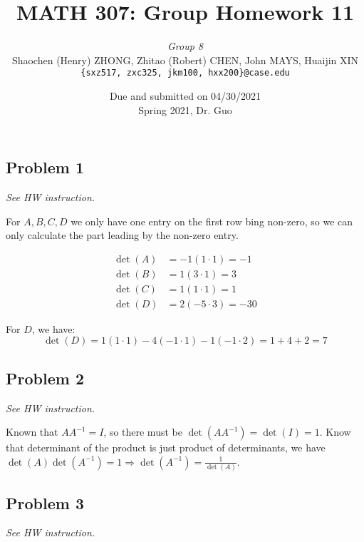 \documentclass[11pt]{article}
\newcommand{\ilc}{\texttt}
\begin{document}
\title{\textbf{MATH 307: Group Homework 11}}


\author{\textit{Group 8}\\
Shaochen (Henry) ZHONG, Zhitao (Robert) CHEN, John MAYS, Huaijin XIN\\ \ilc{\{sxz517, zxc325, jkm100, hxx200\}@case.edu}}

\date{Due and submitted on 04/30/2021 \\ Spring 2021, Dr. Guo}
\maketitle



\subsection*{Problem 1}
\textit{See HW instruction.}\newline

For $A, B, C, D$ we only have one entry on the first row bing non-zero, so we can only calculate the part leading by the non-zero entry.

\begin{align*}
    \det(A) &= - 1(1 \cdot 1) = -1 \\
    \det(B) &= 1(3 \cdot 1) = 3 \\
    \det(C) &= 1(1 \cdot 1) = 1 \\
    \det(D) &= 2(-5 \cdot 3) = -30
\end{align*}

For $D$, we have:
\begin{equation*}
    \det(D) = 1(1 \cdot 1) - 4(-1 \cdot 1) - 1(-1 \cdot 2) = 1 + 4 + 2 = 7
\end{equation*}

\subsection*{Problem 2}
\textit{See HW instruction.}\newline

Known that $A A^{-1} = I$, so there must be $\det(A A^{-1}) = \det(I) = 1$. Know that  determinant of the product is just product of determinants, we have $\det(A) \det(A^{-1}) = 1 \Longrightarrow \det(A^{-1}) = \frac{1}{\det(A)}$.

\subsection*{Problem 3}
\textit{See HW instruction.}\newline
\end{document}

